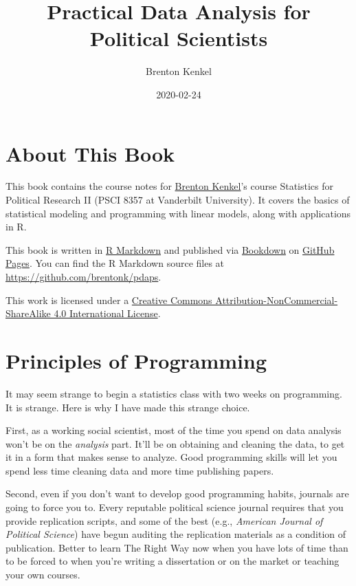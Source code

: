 \documentclass[12pt,oneside,openany]{book}
\title{Practical Data Analysis for Political Scientists}
\author{Brenton Kenkel}
\date{2020-02-24}
\begin{document}
\maketitle

{
\setcounter{tocdepth}{1}
\tableofcontents
}
\chapter{About This Book}\label{about-this-book}

This book contains the course notes for
\href{http://bkenkel.com}{Brenton Kenkel}'s course Statistics for
Political Research II (PSCI 8357 at Vanderbilt University). It covers
the basics of statistical modeling and programming with linear models,
along with applications in R.

This book is written in \href{http://rmarkdown.rstudio.com}{R Markdown}
and published via \href{https://bookdown.org}{Bookdown} on
\href{https://pages.github.com}{GitHub Pages}. You can find the R
Markdown source files at \url{https://github.com/brentonk/pdaps}.

This work is licensed under a
\href{http://creativecommons.org/licenses/by-nc-sa/4.0/}{Creative
Commons Attribution-NonCommercial-ShareAlike 4.0 International License}.

\hypertarget{programming}{\chapter{Principles of
Programming}\label{programming}}

It may seem strange to begin a statistics class with two weeks on
programming. It is strange. Here is why I have made this strange choice.

First, as a working social scientist, most of the time you spend on data
analysis won't be on the \emph{analysis} part. It'll be on obtaining and
cleaning the data, to get it in a form that makes sense to analyze. Good
programming skills will let you spend less time cleaning data and more
time publishing papers.

Second, even if you don't want to develop good programming habits,
journals are going to force you to. Every reputable political science
journal requires that you provide replication scripts, and some of the
best (e.g., \emph{American Journal of Political Science}) have begun
auditing the replication materials as a condition of publication. Better
to learn The Right Way now when you have lots of time than to be forced
to when you're writing a dissertation or on the market or teaching your
own courses.
\end{document}
